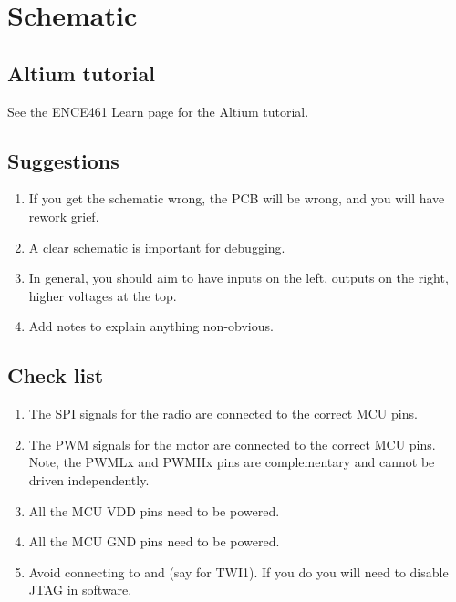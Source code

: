 \chapter{Schematic}


\section{Altium tutorial}


See the ENCE461 Learn page for the Altium tutorial.


\section{Suggestions}

\begin{enumerate}
\item If you get the schematic wrong, the PCB will be wrong, and you
  will have rework grief.

\item A clear schematic is important for debugging.

\item In general, you should aim to have inputs on the left, outputs
  on the right, higher voltages at the top.

\item Add notes to explain anything non-obvious.
\end{enumerate}



\section{Check list}
\label{PCB-check-list}

\begin{enumerate}
\item
  The SPI signals for the radio are connected to the correct MCU pins.
\item
  The PWM signals for the motor are connected to the correct MCU pins.
  Note, the PWMLx and PWMHx pins are complementary and cannot be driven
  independently.
\item
  All the MCU VDD pins need to be powered.
\item
  All the MCU GND pins need to be powered.
\item
  Avoid connecting to  and  (say for TWI1).  If you
  do you will need to disable JTAG in software.
\end{enumerate}
